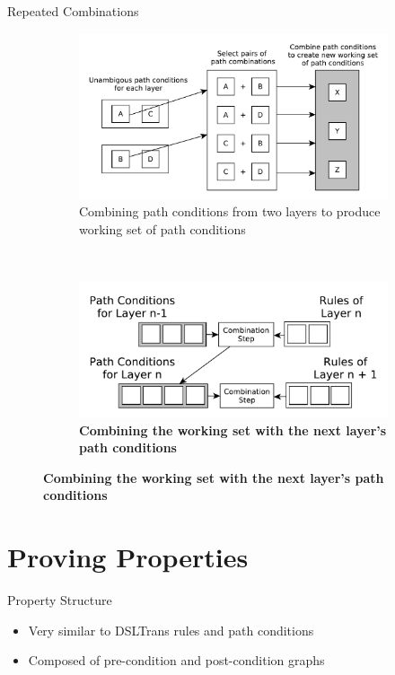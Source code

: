 \documentclass[xcolor=dvipsnames, 14pt]{beamer}
\begin{document}
\begin{frame}{Repeated Combinations}
\begin{figure}[htb]
        \centering
        \begin{subfigure}[b]{0.55\textwidth}
                \centering
                \includegraphics[width=1\textwidth]{../figures/building_path_conditions/combining_path_conditions.pdf}
                \caption{Combining path conditions from two layers to produce working set of path conditions}
                \label{fig:create_working_set}
        \end{subfigure}%
        ~
        \begin{subfigure}[b]{0.42\textwidth}
                \centering
                \includegraphics[width=1\textwidth]{../figures/building_path_conditions/next_layer.pdf}
                \caption{\textbf{Combining the working set with the next layer's path conditions}}
                \label{fig:combine_working_set}
        \end{subfigure}%
        \label{fig:combining_path_conditions}
\end{figure}
\end{frame}

\section{Proving Properties}
\begin{frame}{Property Structure}
\begin{itemize}
\item Very similar to DSLTrans rules and path conditions
\item Composed of pre-condition and post-condition graphs
\end{itemize}

\end{frame}
\end{document}
